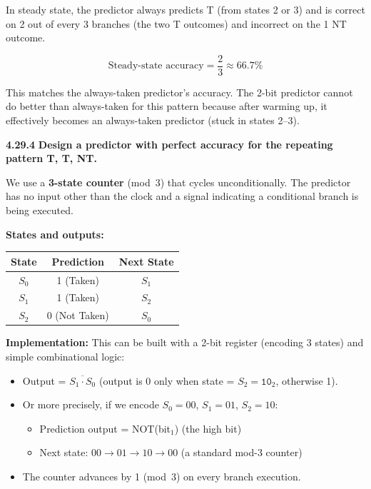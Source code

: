 In steady state, the predictor always predicts T (from states 2 or 3) and is
correct on 2 out of every 3 branches (the two T outcomes) and incorrect on
the 1 NT outcome.

\[
  \text{Steady-state accuracy} = \frac{2}{3} \approx \boxed{66.7\%}
\]

This matches the always-taken predictor's accuracy. The 2-bit predictor cannot
do better than always-taken for this pattern because after warming up, it
effectively becomes an always-taken predictor (stuck in states 2--3).

\medskip\noindent\textbf{4.29.4}
\textbf{Design a predictor with perfect accuracy for the repeating pattern
T, T, NT.}

We use a \textbf{3-state counter} (mod~3) that cycles unconditionally. The
predictor has no input other than the clock and a signal indicating a
conditional branch is being executed.

\textbf{States and outputs:}
\begin{center}
\begin{tabular}{ccc}
\toprule
\textbf{State} & \textbf{Prediction} & \textbf{Next State} \\
\midrule
$S_0$ & 1 (Taken)     & $S_1$ \\
$S_1$ & 1 (Taken)     & $S_2$ \\
$S_2$ & 0 (Not Taken) & $S_0$ \\
\bottomrule
\end{tabular}
\end{center}

\textbf{Implementation:} This can be built with a 2-bit register (encoding
3 states) and simple combinational logic:
\begin{itemize}
  \item Output = $\overline{S_1 \cdot S_0}$ (output is 0 only when state =
    $S_2 = \texttt{10}_2$, otherwise 1).
  \item Or more precisely, if we encode $S_0 = 00$, $S_1 = 01$, $S_2 = 10$:
    \begin{itemize}
      \item Prediction output = NOT(bit$_1$) (the high bit)
      \item Next state: $00 \to 01 \to 10 \to 00$ (a standard mod-3 counter)
    \end{itemize}
  \item The counter advances by 1 (mod~3) on every branch execution.
\end{itemize}

